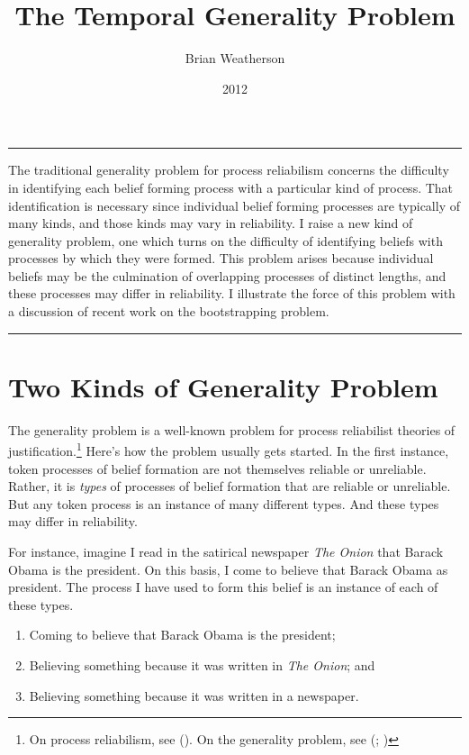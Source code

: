\documentclass[
  10pt,
  letterpaper,
  DIV=11,
  numbers=noendperiod,
  twoside]{scrartcl}
\title{The Temporal Generality Problem}
\author{Brian Weatherson}
\date{2012}
\providecommand{\tightlist}{%
  \setlength{\itemsep}{0pt}\setlength{\parskip}{0pt}}\usepackage{longtable,booktabs,array}
\renewenvironment{abstract}
 {\vspace{-1.25cm}
 \quotation\small\noindent\rule{\linewidth}{.5pt}\par\smallskip
 \noindent }
 {\par\noindent\rule{\linewidth}{.5pt}\endquotation}
\begin{document}
\maketitle
\begin{abstract}
The traditional generality problem for process reliabilism concerns the
difficulty in identifying each belief forming process with a particular
kind of process. That identification is necessary since individual
belief forming processes are typically of many kinds, and those kinds
may vary in reliability. I raise a new kind of generality problem, one
which turns on the difficulty of identifying beliefs with processes by
which they were formed. This problem arises because individual beliefs
may be the culmination of overlapping processes of distinct lengths, and
these processes may differ in reliability. I illustrate the force of
this problem with a discussion of recent work on the bootstrapping
problem.
\end{abstract}


\section{Two Kinds of Generality
Problem}\label{two-kinds-of-generality-problem}

The generality problem is a well-known problem for process reliabilist
theories of justification.\footnote{On process reliabilism, see
  (). On the generality problem,
  see (;
  )} Here's how
the problem usually gets started. In the first instance, token processes
of belief formation are not themselves reliable or unreliable. Rather,
it is \emph{types} of processes of belief formation that are reliable or
unreliable. But any token process is an instance of many different
types. And these types may differ in reliability.

For instance, imagine I read in the satirical newspaper \emph{The Onion}
that Barack Obama is the president. On this basis, I come to believe
that Barack Obama as president. The process I have used to form this
belief is an instance of each of these types.

\begin{enumerate}
\def\labelenumi{\arabic{enumi}.}
\tightlist
\item
  Coming to believe that Barack Obama is the president;
\item
  Believing something because it was written in \emph{The Onion}; and
\item
  Believing something because it was written in a newspaper.
\end{enumerate}
\end{document}
